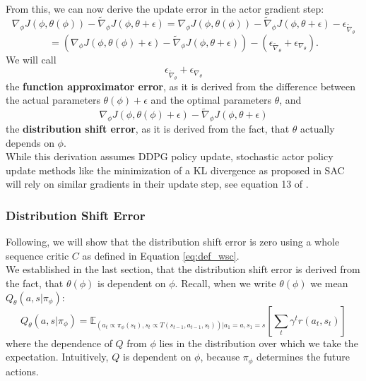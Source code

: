 From this, we can now derive the update error in the actor gradient step:
\begin{equation}
    \label{equation:general_update_error}
    \nabla_{\phi} J(\phi, \theta(\phi)) - \widetilde{\nabla}_\phi J(\phi, \theta + \epsilon) = \nabla_{\phi} J(\phi, \theta(\phi)) - \widetilde{\nabla}_\phi J(\phi, \theta + \epsilon) - \epsilon_{\widetilde{\nabla}_{\theta}}
\end{equation}
\begin{equation*}
    = \left(\nabla_{\phi} J(\phi, \theta(\phi) + \epsilon) - \widetilde{\nabla}_\phi J(\phi, \theta + \epsilon)\right) - \left( \epsilon_{\widetilde{\nabla}_{\theta}} + \epsilon_{\nabla_{\theta}} \right).
\end{equation*}
We will call 
\begin{equation}
    \label{eq:def_func_app_err}
     \epsilon_{\widetilde{\nabla}_{\theta}} + \epsilon_{\nabla_{\theta}}
\end{equation}
the \textbf{function approximator error}, as it is derived from the difference between 
the actual parameters $\theta(\phi) +\epsilon$ and the optimal parameters $\theta$, and \\
\begin{equation}
    \label{eq:def_di_sh_err}
    \nabla_{\phi} J(\phi, \theta(\phi) + \epsilon) - \widetilde{\nabla}_\phi J(\phi, \theta + \epsilon)
\end{equation}
the \textbf{distribution shift error}, as it is derived from the fact, that $\theta$ actually depends on $\phi$. \\
While this derivation assumes DDPG policy update, stochastic actor policy update methods like the minimization of a KL divergence as 
proposed in SAC will rely on similar gradients in their update step, see equation 13 of \cite{haarnoja2018soft}.

\subsubsection{Distribution Shift Error}
\label{dist_shift_error_section}
Following, we will show that the distribution shift error is zero using a whole sequence critic $C$ as defined in Equation \ref{eq:def_wsc}. \\ 

We established in the last section, that the distribution shift error is derived from the fact, that $\theta(\phi)$ is dependent on $\phi$. 
Recall, when we write $\theta(\phi)$ we mean $Q_{\theta}(a,s|\pi_{\phi})$:
\begin{equation*}
    Q_{\theta}(a,s|\pi_{\phi}) = \mathbb{E}_{(a_t \propto \pi_{\phi}(s_t), s_t \propto T(s_{t-1}, a_{t-1}, s_t))|a_1=a, s_1=s}\left[\sum_t \gamma^t r(a_t, s_t)\right]
\end{equation*}
where the dependence of $Q$ from $\phi$ lies in the distribution over which we take the expectation. Intuitively, $Q$ is dependent on $\phi$, because $\pi_{\phi}$ determines the 
future actions.\\ 


